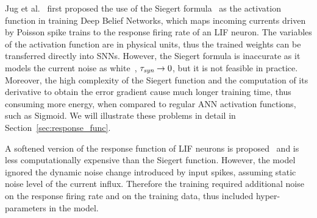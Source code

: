 	Jug et al.~\citep{Jug_etal_2012} first proposed the use of the Siegert formula~\citep{siegert1951first} as the activation function in training Deep Belief Networks, which maps incoming currents driven by Poisson spike trains to the response firing rate of an LIF neuron.
	The variables of the activation function are in physical units, thus the trained weights can be transferred directly into SNNs.
	However, the Siegert formula is inaccurate as it models the current noise as white~\citep{liu2016noisy}, $\tau_{\textit{\textrm{syn}}} \to 0$, but it is not feasible in practice.
	Moreover, the high complexity of the Siegert function and the computation of its derivative to obtain the error gradient cause much longer training time, thus consuming more energy, when compared to regular ANN activation functions, such as Sigmoid.
	We will illustrate these problems in detail in Section~\ref{sec:response_func}. %
	
	A softened version of the response function of LIF neurons is proposed~\citep{hunsberger2015spiking} and is less computationally expensive than the Siegert function.
	However, the model ignored the dynamic noise change introduced by input spikes, assuming static noise level of the current influx.
	Therefore the training required additional noise on the response firing rate and on the training data, thus included hyper-parameters in the model.
	
